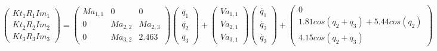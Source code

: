 \[
\begin{pmatrix}
Kt_{1}R_{1}Im_{1} \\

Kt_{2}R_{2}Im_{2} \\

Kt_{3}R_{3}Im_{3}
\end{pmatrix} =
\begin{pmatrix}
Ma_{1,1} & 0 & 0 \\

0 & Ma_{2,2} & Ma_{2,3}\\

0 & Ma_{3,2} & 2.463
\end{pmatrix}
\begin{pmatrix}
\ddot{q_{1}} \\

\ddot{q_{2}}  \\

\ddot{q_{3}}
\end{pmatrix} +
\begin{pmatrix}
Va_{1,1}\\

Va_{2,1} \\

Va_{3,1}
\end{pmatrix}
\begin{pmatrix}
\dot{q_{1}} \\

\dot{q_{2}}  \\

\dot{q_{3}}
\end{pmatrix} +
\begin{pmatrix}
0 \\

1.81cos(q_{2} + q_{3}) + 5.44cos(q_{2}) \\

4.15cos(q_{2} + q_{3})
\end{pmatrix}\]



